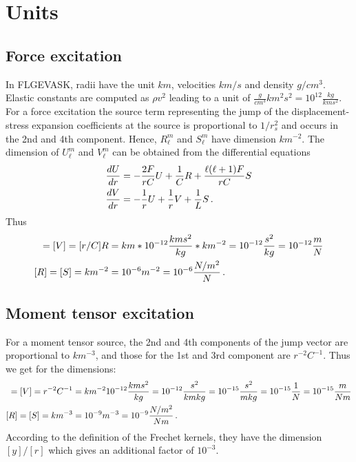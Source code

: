 \documentclass[12pt,a4paper]{article}
\begin{document}
\section{Units}
\subsection{Force excitation}
In FLGEVASK, radii have the unit $km$, velocities $km/s$ and density $g/cm^3$. Elastic constants are computed as $\rho v^2$ leading to a unit of $\frac{g}{cm^3}{km^2}{s^2} = 10^{12} \frac{kg}{km s^2}$.  
For a force excitation the source term representing the jump of the displacement-stress expansion coefficients at the source is proportional to $1/r_s^2$ and occurs in the 2nd and 4th component. Hence, $R_\ell^m$ and $S_\ell^m$ have dimension $km^{-2}$.
The dimension of $U_\ell^m$ and $V_\ell^m$ can be obtained from the differential equations
\begin{align}
\frac{dU}{dr} &=-\frac{2F}{rC}U+\frac{1}{C}R+\frac{\ell(\ell+1)F}{rC} S \notag \\
\frac{dV}{dr} &=-\frac{1}{r}U+\frac{1}{r}V+\frac{1}{L}S \notag \,.
\end{align}
Thus
\begin{align}
[U] = [V] = [r/C]R  &= km*10^{-12}\frac{km s^2}{kg}*km^{-2} = 10^{-12}\frac{s^2}{kg} = 10^{-12}\frac{m}{N} \notag \\
[R] = [S] = km^{-2} &= 10^{-6} m^{-2} = 10^{-6} \frac{N/m^2}{N} \notag \,.
\end{align}
%
\subsection{Moment tensor excitation}
For a moment tensor source, the 2nd and 4th components of the jump vector are proportional to $km^{-3}$, and those for the 1st and 3rd component are $r^{-2}C^{-1}$. Thus we get for the dimensions:
\begin{align}
[U] = [V] =  r^{-2}C^{-1} &= km^{-2} 10^{-12}\frac{km s^2}{kg} = 10^{-12}\frac{s^2}{km kg} =  10^{-15}\frac{s^2}{m kg} = 10^{-15}\frac{1}{N} = 10^{-15}\frac{m}{Nm} \notag \\
[R] = [S] = km^{-3} &= 10^{-9} m^{-3} = 10^{-9} \frac{N/m^2}{Nm} \notag \,.
\end{align}
According to the definition of the Frechet kernels, they have the dimension $[y]/[r]$ which gives an additional factor of $10^{-3}$. 
\end{document}
